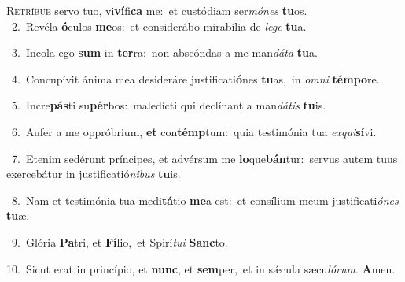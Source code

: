 \lettrine{\initial\textcolor{\initialcolor}{R}}{etríbue} servo tuo, vi\-\textbf{ví}\-fi\textbf{ca} me:~\star et custódiam ser\-\textit{mó}\-\textit{nes} \textbf{tu}\-os.\\
{\numbfont\textcolor{\numbcolor}{~2.}}~Revéla \textbf{ó}\-culos \textbf{me}\-os:~\star et considerábo mirabília de \textit{le}\-\textit{ge} \textbf{tu}\-a.\par
{\numbfont\textcolor{\numbcolor}{~3.}}~Incola ego \textbf{sum} in \textbf{ter}\-ra:~\star non abscóndas a me man\-\textit{dá}\-\textit{ta} \textbf{tu}\-a.\par
{\numbfont\textcolor{\numbcolor}{~4.}}~Concupívit ánima mea desideráre justificati\-\textbf{ó}\-nes \textbf{tu}\-as,~\star in \textit{om}\-\textit{ni} \textbf{tém}\-\textbf{po}re.\par
{\numbfont\textcolor{\numbcolor}{~5.}}~Incre\-\textbf{pás}\-ti su\-\textbf{pér}\-bos:~\star maledícti qui declínant a man\-\textit{dá}\-\textit{tis} \textbf{tu}\-is.\par
{\numbfont\textcolor{\numbcolor}{~6.}}~Aufer a me oppróbrium, \textbf{et} con\-\textbf{témp}\-tum:~\star quia testimónia tua \textit{ex}\-\textit{qui}\textbf{sí}vi.\par
{\numbfont\textcolor{\numbcolor}{~7.}}~Etenim sedérunt príncipes, et advérsum me \textbf{lo}\-que\-\textbf{bán}\-tur:~\star servus autem tuus exercebátur in justificatió\-\textit{ni}\-\textit{bus} \textbf{tu}\-is.\par
{\numbfont\textcolor{\numbcolor}{~8.}}~Nam et testimónia tua medi\-\textbf{tá}\-tio \textbf{me}\-a est:~\star et consílium meum justificati\-\textit{ó}\-\textit{nes} \textbf{tu}\-æ.\par
{\numbfont\textcolor{\numbcolor}{~9.}}~Glória \textbf{Pa}\-tri, et \textbf{Fí}\-lio,~\star et Spirí\-\textit{tu}\-\textit{i} \textbf{Sanc}\-to.\par
{\numbfont\textcolor{\numbcolor}{10.}}~Sicut erat in princípio, et \textbf{nunc}\-, et \textbf{sem}\-per,~\star et in sǽcula sæcu\-\textit{ló}\-\textit{rum}. \textbf{A}\-men.\par
